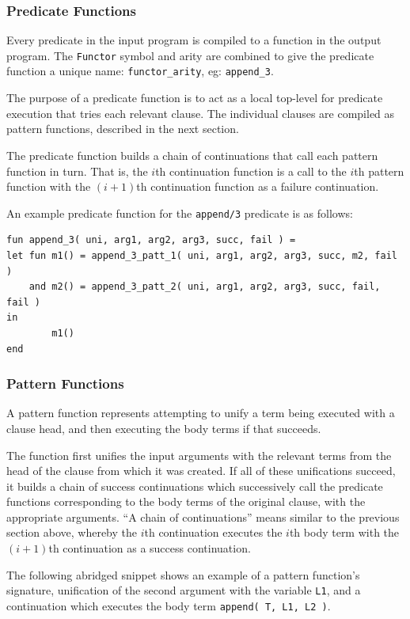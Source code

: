 \documentclass[12pt]{article}
\begin{document}
\subsubsection{Predicate Functions}

Every predicate in the input program is compiled to a function in the output program. 
The \verb|Functor| symbol and arity are combined to give the predicate function a unique name: \verb|functor_arity|, eg: \verb|append_3|.

The purpose of a predicate function is to act as a local top-level for predicate execution that tries each relevant clause. The individual clauses are compiled as pattern functions, described in the next section. 

The predicate function builds a chain of continuations that call each pattern function in turn.
That is, the $i$th continuation function is a call to the $i$th pattern function with the $(i+1)$th continuation function as a failure continuation.

An example predicate function for the \verb|append/3| predicate is as follows:

\begin{verbatim}
fun append_3( uni, arg1, arg2, arg3, succ, fail ) = 
let fun m1() = append_3_patt_1( uni, arg1, arg2, arg3, succ, m2, fail )
    and m2() = append_3_patt_2( uni, arg1, arg2, arg3, succ, fail, fail ) 
in
        m1()
end
\end{verbatim}

\subsubsection{Pattern Functions}

A pattern function represents attempting to unify a term being executed with a clause head, and then executing the body terms if that succeeds.

The function first unifies the input arguments with the relevant terms from the head of the clause from which it was created.
If all of these unifications succeed, it builds a chain of success continuations which successively call the predicate functions corresponding to the body terms of the original clause, with the appropriate arguments.
``A chain of continuations'' means similar to the previous section above, whereby the $i$th continuation executes the $i$th body term with the $(i+1)$th continuation as a success continuation.

The following abridged snippet shows an example of a pattern function's signature, unification of the second argument with the variable \verb|L1|, and a continuation which executes the body term \verb|append( T, L1, L2 )|.
\end{document}
